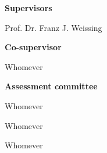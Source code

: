 
    \textbf{Supervisors}
    \begin{description}
        \item Prof. Dr. Franz J. Weissing
    \end{description}

    \vspace{6mm}

    \textbf{Co-supervisor}
    \begin{description}
        \item Whomever
    \end{description}

    \vspace{6mm}

    \textbf{Assessment committee}
    \begin{description}
        \item Whomever
        \item Whomever
        \item Whomever
    \end{description}

\clearpage
